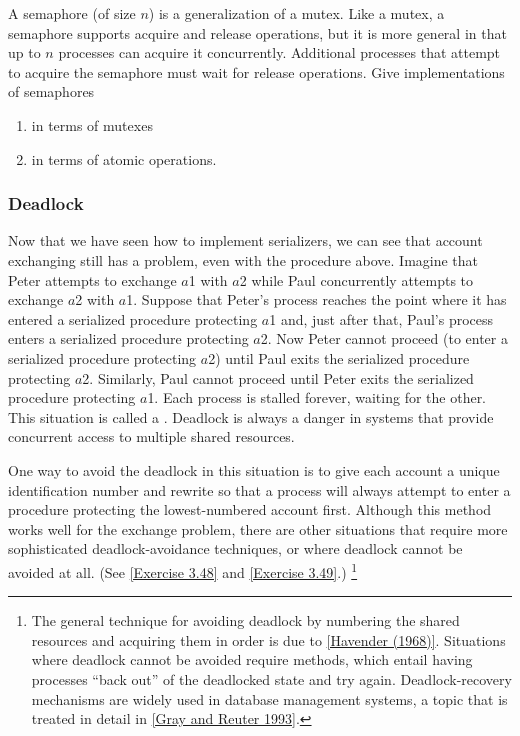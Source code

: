 \begin{exercise}
	\label{Exercise 3.47}
	A semaphore (of size \( n \)) is a generalization of a mutex.
	Like a mutex, a semaphore supports acquire and release operations, but it is more general in that up to \( n \) processes can acquire it concurrently.
	Additional processes that attempt to acquire the semaphore must wait for release operations.
	Give implementations of semaphores
	\begin{enumerate}[label = \alph*., leftmargin = *]

		\item
			in terms of mutexes

		\item
			in terms of atomic  operations.

	\end{enumerate}
\end{exercise}



\subsubsection*{Deadlock}

Now that we have seen how to implement serializers, we can see that account exchanging still has a problem, even with the  procedure above.
Imagine that Peter attempts to exchange \( a \)1 with \( a \)2 while Paul concurrently attempts to exchange \( a \)2 with \( a \)1.
Suppose that Peter’s process reaches the point where it has entered a serialized procedure protecting \( a \)1 and, just after that, Paul’s process enters a serialized procedure protecting \( a \)2.
Now Peter cannot proceed (to enter a serialized procedure protecting \( a \)2) until Paul exits the serialized procedure protecting \( a \)2.
Similarly, Paul cannot proceed until Peter exits the serialized procedure protecting \( a \)1.
Each process is stalled forever, waiting for the other.
This situation is called a .
Deadlock is always a danger in systems that provide concurrent access to multiple shared resources.

One way to avoid the deadlock in this situation is to give each account a unique identification number and rewrite  so that a process will always attempt to enter a procedure protecting the lowest-numbered account first.
Although this method works well for the exchange problem, there are other situations that require more sophisticated deadlock-avoidance techniques, or where deadlock cannot be avoided at all.
(See \cref{Exercise 3.48} and \cref{Exercise 3.49}.)%
\footnote{
	The general technique for avoiding deadlock by numbering the shared resources and acquiring them in order is due to \cref{Havender (1968)}.
	Situations where deadlock cannot be avoided require  methods, which entail having processes “back out” of the deadlocked state and try again.
	Deadlock-recovery mechanisms are widely used in database management systems, a topic that is treated in detail in \cref{Gray and Reuter 1993}.
}



